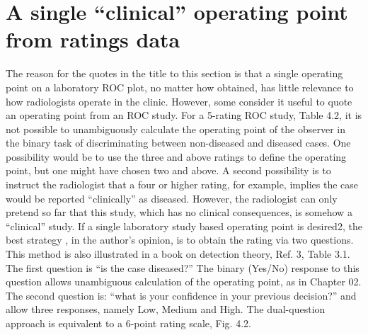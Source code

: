 \documentclass[
]{book}
\begin{document}
\hypertarget{a-single-clinical-operating-point-from-ratings-data}{%
\section{A single ``clinical'' operating point from ratings data}\label{a-single-clinical-operating-point-from-ratings-data}}

The reason for the quotes in the title to this section is that a single operating point on a laboratory ROC plot, no matter how obtained, has little relevance to how radiologists operate in the clinic. However, some consider it useful to quote an operating point from an ROC study. For a 5-rating ROC study, Table 4.2, it is not possible to unambiguously calculate the operating point of the observer in the binary task of discriminating between non-diseased and diseased cases. One possibility would be to use the three and above ratings to define the operating point, but one might have chosen two and above. A second possibility is to instruct the radiologist that a four or higher rating, for example, implies the case would be reported ``clinically'' as diseased. However, the radiologist can only pretend so far that this study, which has no clinical consequences, is somehow a ``clinical'' study. If a single laboratory study based operating point is desired2, the best strategy , in the author's opinion, is to obtain the rating via two questions. This method is also illustrated in a book on detection theory, Ref. 3, Table 3.1. The first question is ``is the case diseased?'' The binary (Yes/No) response to this question allows unambiguous calculation of the operating point, as in Chapter 02. The second question is: ``what is your confidence in your previous decision?'' and allow three responses, namely Low, Medium and High. The dual-question approach is equivalent to a 6-point rating scale, Fig. 4.2.
\end{document}

